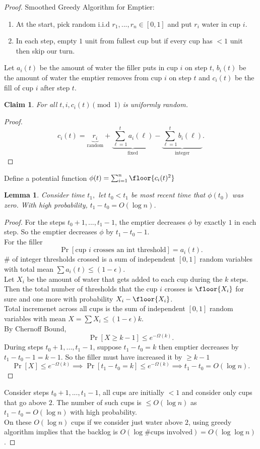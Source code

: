 \documentclass[a4paper]{article}
\newtheorem{lem}[thm]{Lemma}
\newtheorem{claim}[thm]{Claim}
\begin{document}
\begin{proof}
    Smoothed Greedy Algorithm for Emptier:
    \begin{enumerate}
        \item At the start, pick random i.i.d $r_1,...,r_n\in [0,1]$ and put $r_i$ water in cup $i$. 
        \item In each step, empty $1$ unit from fullest cup but if every cup has $<1$ unit then skip our turn. 
    \end{enumerate}
    Let $a_i(t)$ be the amount of water the filler puts in cup $i$ on step $t$, $b_i(t)$ be the amount of water the emptier removes from cup $i$ on step $t$ and $c_i(t)$ be the fill of cup $i$ after step $t.$
    \begin{claim}
        For all $t,i, c_i(t) \pmod 1$ is uniformly random. 
    \end{claim}
    \begin{proof}
        \[
        c_i(t)=\underbrace{r_i}_{\text{random}}+\underbrace{\sum_{\ell=1}^t a_i(\ell)}_{ \text{fixed}}-\underbrace{\sum_{\ell=1}^t b_i(\ell)}_{ \text{integer}}
        .\] 
    \end{proof}
    \noindent Define a potential function $\phi(t)=\sum_{i=1}^n \floor{c_i(t)^2}$
    \begin{lem}
        Consider time $t_1,$ let $t_0<t_1$ be most recent time that $\phi(t_0)$ was zero. With high probability, $t_1-t_0=O(\log n)$. 
    \end{lem}
    \begin{proof}
        For the steps $t_0+1,...,t_1-1$, the emptier decreases $\phi$ by exactly $1$ in each step. So the emptier decreases $\phi$ by $t_1-t_0-1$. \\
        For the filler \[
        \Pr[ \text{cup $i$ crosses an int threshold}]=a_i(t)
        .\] 
        \# of integer thresholds crossed is a sum of independent $[0,1]$ random variables with total mean $\sum a_i(t)\leq (1-\epsilon)$.\\
        Let $X_i$ be the amount of water that gets added to each cup during the $k$ steps. Then the total number of thresholds that the cup $i$ crosses is $\floor{X_i}$ for sure and one more with probability $X_i-\floor{X_i}$.\\
        Total incremenet across all cups is the sum of independent $[0,1]$ random variables with mean $X=\sum X_i \leq (1-\epsilon)k$. \\
        By Chernoff Bound, \[
        \Pr[X\geq k-1]\leq e^{-\Omega(k)}
        .\] 
        During steps $t_0+1,...,t_1-1$, suppose $t_1-t_0=k$ then emptier decreases by $t_1-t_0-1=k-1$. So the filler must have increased it by $\geq k-1$ \[
        \Pr[X]\leq e^{-\Omega(k)}\implies \Pr[t_1-t_0=k]\leq e^{-\Omega(k)}\implies t_1-t_0=O(\log n)
        .\] 
    \end{proof}
    \noindent Consider steps $t_0+1,...,t_1-1$, all cups are initially $<1$ and consider only cups that go above $2$. The number of such cups is $\leq O(\log n)$ as $t_1-t_0=O(\log n)$ with high probability. \\
    On these $O(\log n)$ cups if we consider just water above $2$, using greedy algorithm implies that the backlog is $O(\log \# \text{cups involved})=O(\log \log n)$. 
\end{proof}
\newpage
\end{document}
